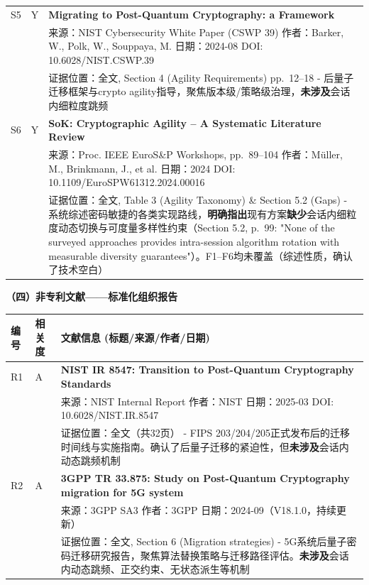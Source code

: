 \documentclass[12pt,a4paper]{article}
\begin{document}
\begin{longtable}{|p{1.2cm}|p{1.8cm}|p{11.6cm}|}
\hline
S5 & Y & \textbf{Migrating to Post-Quantum Cryptography: a Framework} \\
& & 来源：NIST Cybersecurity White Paper (CSWP 39) \quad 作者：Barker, W., Polk, W., Souppaya, M. \quad 日期：2024-08 \quad DOI: 10.6028/NIST.CSWP.39 \\
& & 证据位置：全文, Section 4 (Agility Requirements) pp.~12--18 - 后量子迁移框架与crypto agility指导，聚焦版本级/策略级治理，\textbf{未涉及}会话内细粒度跳频 \\
\hline
S6 & Y & \textbf{SoK: Cryptographic Agility -- A Systematic Literature Review} \\
& & 来源：Proc. IEEE EuroS\&P Workshops, pp.~89--104 \quad 作者：Müller, M., Brinkmann, J., et al. \quad 日期：2024 \quad DOI: 10.1109/EuroSPW61312.2024.00016 \\
& & 证据位置：全文, Table 3 (Agility Taxonomy) \& Section 5.2 (Gaps) - 系统综述密码敏捷的各类实现路线，\textbf{明确指出}现有方案\textbf{缺少}会话内细粒度动态切换与可度量多样性约束（Section 5.2, p.~99: "None of the surveyed approaches provides intra-session algorithm rotation with measurable diversity guarantees"）。F1--F6均未覆盖（综述性质，确认了技术空白） \\
\hline

\end{longtable}

\textbf{（四）非专利文献——标准化组织报告}


\begin{longtable}{|p{1.2cm}|p{1.8cm}|p{11.6cm}|}
\hline
\textbf{编号} & \textbf{相关度} & \textbf{文献信息 (标题/来源/作者/日期)} \\
\hline

R1 & A & \textbf{NIST IR 8547: Transition to Post-Quantum Cryptography Standards} \\
& & 来源：NIST Internal Report \quad 作者：NIST \quad 日期：2025-03 \quad DOI: 10.6028/NIST.IR.8547 \\
& & 证据位置：全文（共32页） - FIPS 203/204/205正式发布后的迁移时间线与实施指南。确认了后量子迁移的紧迫性，但\textbf{未涉及}会话内动态跳频机制 \\
\hline
R2 & A & \textbf{3GPP TR 33.875: Study on Post-Quantum Cryptography migration for 5G system} \\
& & 来源：3GPP SA3 \quad 作者：3GPP \quad 日期：2024-09（V18.1.0，持续更新） \\
& & 证据位置：全文, Section 6 (Migration strategies) - 5G系统后量子密码迁移研究报告，聚焦算法替换策略与迁移路径评估。\textbf{未涉及}会话内动态跳频、正交约束、无状态派生等机制 \\
\hline
\end{longtable}
\end{document}
